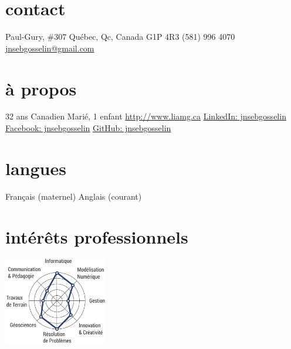 \documentclass[]{friggos-cv} %
\begin{document}


\begin{aside} %
	\section{contact}%
	    \vspace{5pt}
		\home{} Paul-Gury, \#307
		\hspace{0.43cm}Québec, Qc, Canada
		\hspace{0.43cm}G1P 4R3\vspace{5pt}
		\phoneb \space (581) 996 4070
		\href{mailto:jnsebgosselin@gmail.com}{\mail\space jnsebgosselin@gmail.com}
		\vspace{10pt}%
	\section{à propos}%
		\vspace{5pt}
		32 ans
		Canadien
		Marié, 1 enfant%
		\vspace{5pt}
		\href{http://www.liamg.ca/qui-sommes-nous/jean-sebastien-gosselin/}{\globe\hspace{0.1cm} http://www.liamg.ca}
		\href{https://www.linkedin.com/in/jnsebgosselin}{\linkedin\hspace{0.1cm} LinkedIn: jnsebgosselin}
		\href{https://www.facebook.com/jnsebgosselin}{\facebook\hspace{0.1cm} Facebook: jnsebgosselin}
		\href{https://github.com/jnsebgosselin}{\github\hspace{0.1cm} GitHub: jnsebgosselin}
		\vspace{10pt}%
	\section{langues}%
		\vspace{5pt}
		Français (maternel)
		Anglais (courant)
		\vspace{10pt}%
	\section{intérêts professionnels}%
		\vspace{10pt}
		\includegraphics[width=4.5cm]{prof_interests_graph}
		\vspace{5pt}%

\end{aside}
\end{document}
